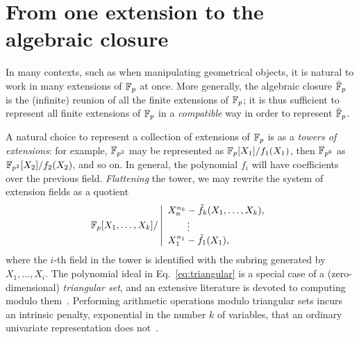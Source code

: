 \documentclass{report}
\theoremstyle{plain}
\theoremstyle{definition}
\begin{document}

\section{From one extension to the algebraic closure}

In many contexts, such as when manipulating geometrical objects, it is
natural to work in many extensions of $\mathbb{F}_p$ at once. %
More generally, the algebraic closure $\bar{\mathbb{F}}_p$ is the (infinite)
reunion of all the finite extensions of $\mathbb{F}_p$; it is thus sufficient
to represent all finite extensions of $\mathbb{F}_p$ in a \emph{compatible}
way in order to represent $\bar{\mathbb{F}}_p$.

A natural choice to represent a collection of extensions of $\mathbb{F}_p$ is
as a \emph{towers of extensions}: for example, $\mathbb{F}_{p^2}$ may be
represented as $\mathbb{F}_{p}[X_1]/f_1(X_1)$, then $\mathbb{F}_{p^6}$ as
$\mathbb{F}_{p^2}[X_2]/f_2(X_2)$, and so on. %
In general, the polynomial $f_i$ will have coefficients over the
previous field. %
\emph{Flattening} the tower, we may rewrite the system of extension
fields as a quotient
\begin{equation}
  \label{eq:triangular}
  \mathbb{F}_p[X_1,\dots,X_k] /
  \left|\begin{array}{l}
          X_n^{n_k} - \tilde{f}_k(X_1,\dots,X_k),\\
          \qquad\vdots\\
          X_1^{n_1} - \tilde{f}_1(X_1),
        \end{array}\right.
\end{equation}
where the $i$-th field in the tower is identified with the subring
generated by $X_1,\dots,X_i$. %
The polynomial ideal in Eq.~\eqref{eq:triangular} is a special case of
a (zero-dimensional) \emph{triangular set}, and an extensive
literature is devoted to computing modulo them~\cite{todo}. %
Performing arithmetic operations modulo triangular sets incurs an
intrinsic penalty, exponential in the number $k$ of variables, that an
ordinary univariate representation does
not~\cite{canny+kaltofen+yagati89,li+moreno+schost07,vanderHoeven:2004:TFT:1005285.1005327}. %
\end{document}
